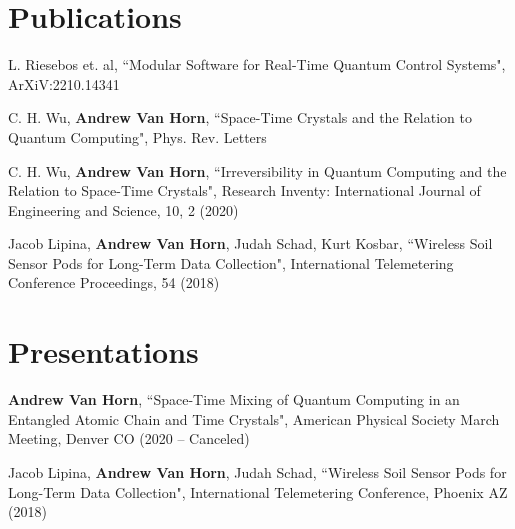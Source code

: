 \documentclass[letterpaper,11pt]{article}
\begin{document}
\section{Publications}
\begin{itemize}[leftmargin=0.15in, label={}]
        \small{\item{
			L. Riesebos et. al, ``Modular Software for Real-Time Quantum Control Systems", ArXiV:2210.14341
	}}
	\small{\item{
			C. H. Wu, \textbf{Andrew Van Horn}, ``Space-Time Crystals and the Relation to Quantum Computing", Phys. Rev. Letters
	}}
	\small{\item{
		C. H. Wu, \textbf{Andrew Van Horn}, ``Irreversibility in Quantum Computing and the Relation to Space-Time Crystals", Research Inventy: International Journal of Engineering and Science, 10, 2 (2020)
	}}
	\small{\item{
			Jacob Lipina, \textbf{Andrew Van Horn}, Judah Schad, Kurt Kosbar, ``Wireless Soil Sensor Pods for Long-Term Data Collection", International Telemetering Conference Proceedings, 54 (2018)
	}}
\end{itemize}	

\section{Presentations}
\begin{itemize}[leftmargin=0.15in, label={}]
	\small{\item{
			\textbf{Andrew Van Horn}, ``Space-Time Mixing of Quantum Computing in an Entangled Atomic Chain and Time Crystals", American Physical Society March Meeting, Denver CO (2020 -- Canceled)
	}}
	\small{\item{
			Jacob Lipina, \textbf{Andrew Van Horn}, Judah Schad, ``Wireless Soil Sensor Pods for Long-Term Data Collection", International Telemetering Conference, Phoenix AZ (2018)
	}}
\end{itemize}

\end{document}
